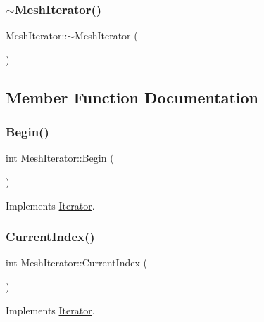 \subsubsection{\texorpdfstring{$\sim$MeshIterator()}{~MeshIterator()}}
{\footnotesize\ttfamily Mesh\+Iterator\+::$\sim$\+Mesh\+Iterator (\begin{DoxyParamCaption}{ }\end{DoxyParamCaption})}



\subsection{Member Function Documentation}
\mbox{\label{class_mesh_iterator_a07a9e1405ac4297b6300875b9084d946}} 
\subsubsection{\texorpdfstring{Begin()}{Begin()}}
{\footnotesize\ttfamily int Mesh\+Iterator\+::\+Begin (\begin{DoxyParamCaption}{ }\end{DoxyParamCaption})\hspace{0.3cm}{\ttfamily [virtual]}}



Implements \mbox{\hyperlink{class_iterator_aceb0c4d549106fab9b8d6ba9965f0d6f}{Iterator}}.

\mbox{\label{class_mesh_iterator_a72853e5e422c2e0bdb1fc084d7fb5118}} 
\subsubsection{\texorpdfstring{CurrentIndex()}{CurrentIndex()}}
{\footnotesize\ttfamily int Mesh\+Iterator\+::\+Current\+Index (\begin{DoxyParamCaption}{ }\end{DoxyParamCaption})\hspace{0.3cm}{\ttfamily [virtual]}}



Implements \mbox{\hyperlink{class_iterator_a5254a8ede30314e572c5f35e3a7f8e8c}{Iterator}}.

